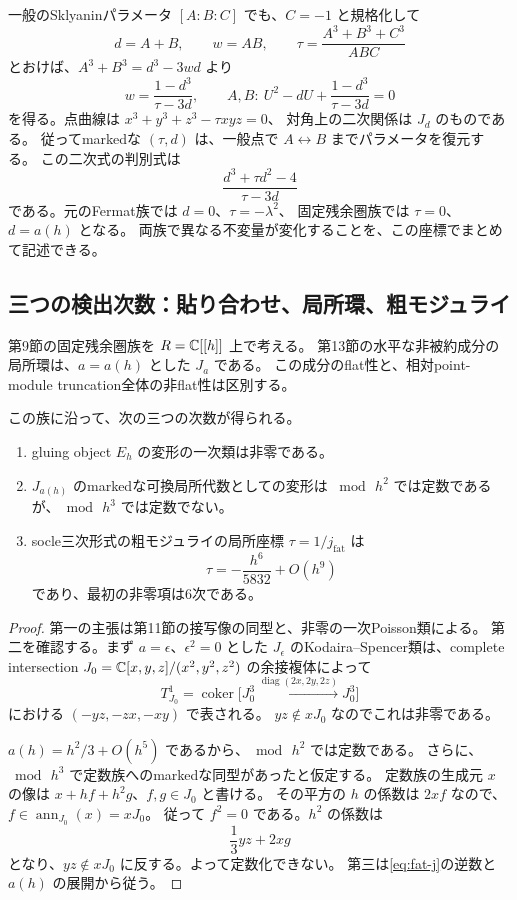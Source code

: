 一般のSklyaninパラメータ $[A:B:C]$ でも、$C=-1$ と規格化して
\[
 d=A+B,\qquad w=AB,\qquad
 \tau=\frac{A^3+B^3+C^3}{ABC}
\]
とおけば、$A^3+B^3=d^3-3wd$ より
\begin{equation}\label{eq:general-sklyanin-recovery}
 w=\frac{1-d^3}{\tau-3d},\qquad
 A,B:\ U^2-dU+\frac{1-d^3}{\tau-3d}=0
\end{equation}
を得る。点曲線は $x^3+y^3+z^3-\tau xyz=0$、
対角上の二次関係は $J_d$ のものである。
従ってmarkedな $(\tau,d)$ は、一般点で $A\leftrightarrow B$ までパラメータを復元する。
この二次式の判別式は
\[
 \frac{d^3+\tau d^2-4}{\tau-3d}
\]
である。元のFermat族では $d=0$、$\tau=-\lambda^2$、
固定残余圏族では $\tau=0$、$d=a(h)$ となる。
両族で異なる不変量が変化することを、この座標でまとめて記述できる。

\subsection{三つの検出次数：貼り合わせ、局所環、粗モジュライ}

第9節の固定残余圏族を $R=\mathbb C[[h]]$ 上で考える。
第13節の水平な非被約成分の局所環は、$a=a(h)$ とした $J_a$ である。
この成分のflat性と、相対point-module truncation全体の非flat性は区別する。

\begin{theorem}[固定残余圏族で最初に見える次数]\label{thm:orders-126}
この族に沿って、次の三つの次数が得られる。
\begin{enumerate}
 \item gluing object $E_h$ の変形の一次類は非零である。
 \item $J_{a(h)}$ のmarkedな可換局所代数としての変形は
 $\bmod\,h^2$ では定数であるが、$\bmod\,h^3$ では定数でない。
 \item socle三次形式の粗モジュライの局所座標 $\tau=1/j_{\mathrm{fat}}$ は
 \[
   \tau=-\frac{h^6}{5832}+O(h^9)
 \]
 であり、最初の非零項は6次である。
\end{enumerate}
\end{theorem}

\begin{proof}
第一の主張は第11節の接写像の同型と、非零の一次Poisson類による。
第二を確認する。まず $a=\epsilon$、$\epsilon^2=0$ とした
$J_\epsilon$ のKodaira--Spencer類は、complete intersection
$J_0=\mathbb C[x,y,z]/(x^2,y^2,z^2)$ の余接複体によって
\[
 T^1_{J_0}=\operatorname{coker}
 \bigl[J_0^3\xrightarrow{\operatorname{diag}(2x,2y,2z)}J_0^3\bigr]
\]
における $(-yz,-zx,-xy)$ で表される。
$yz\notin xJ_0$ なのでこれは非零である。

$a(h)=h^2/3+O(h^5)$ であるから、$\bmod\,h^2$ では定数である。
さらに、$\bmod\,h^3$ で定数族へのmarkedな同型があったと仮定する。
定数族の生成元 $x$ の像は
$x+h f+h^2g$、$f,g\in J_0$ と書ける。
その平方の $h$ の係数は $2xf$ なので、$f\in\operatorname{ann}_{J_0}(x)=xJ_0$。
従って $f^2=0$ である。$h^2$ の係数は
\[
 \frac13yz+2xg
\]
となり、$yz\notin xJ_0$ に反する。よって定数化できない。
第三は\eqref{eq:fat-j}の逆数と $a(h)$ の展開から従う。
\end{proof}

